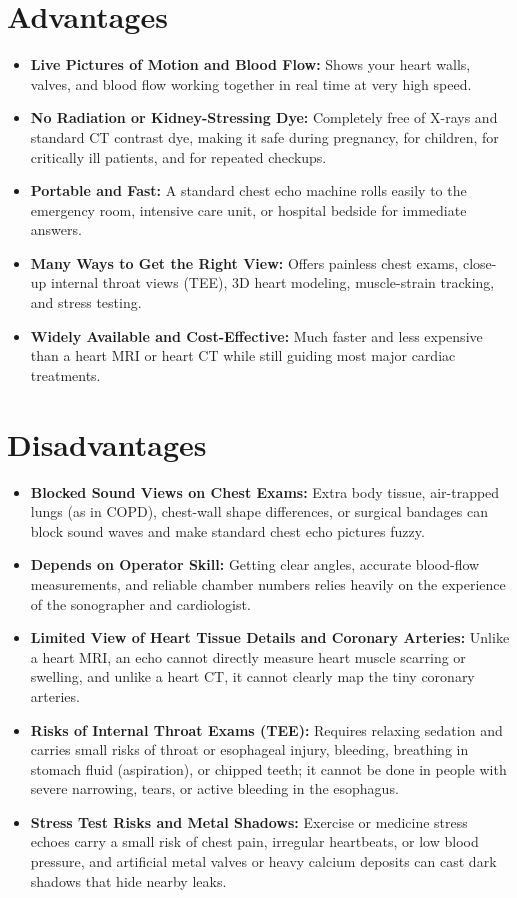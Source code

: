 \section{Advantages}
\begin{itemize}
\item \textbf{Live Pictures of Motion and Blood Flow:} Shows your heart walls, valves, and blood flow working together in real time at very high speed.
\item \textbf{No Radiation or Kidney-Stressing Dye:} Completely free of X-rays and standard CT contrast dye, making it safe during pregnancy, for children, for critically ill patients, and for repeated checkups.
\item \textbf{Portable and Fast:} A standard chest echo machine rolls easily to the emergency room, intensive care unit, or hospital bedside for immediate answers.
\item \textbf{Many Ways to Get the Right View:} Offers painless chest exams, close-up internal throat views (TEE), 3D heart modeling, muscle-strain tracking, and stress testing.
\item \textbf{Widely Available and Cost-Effective:} Much faster and less expensive than a heart MRI or heart CT while still guiding most major cardiac treatments.
\end{itemize}


\section{Disadvantages}
\begin{itemize}
\item \textbf{Blocked Sound Views on Chest Exams:} Extra body tissue, air-trapped lungs (as in COPD), chest-wall shape differences, or surgical bandages can block sound waves and make standard chest echo pictures fuzzy.
\item \textbf{Depends on Operator Skill:} Getting clear angles, accurate blood-flow measurements, and reliable chamber numbers relies heavily on the experience of the sonographer and cardiologist.
\item \textbf{Limited View of Heart Tissue Details and Coronary Arteries:} Unlike a heart MRI, an echo cannot directly measure heart muscle scarring or swelling, and unlike a heart CT, it cannot clearly map the tiny coronary arteries.
\item \textbf{Risks of Internal Throat Exams (TEE):} Requires relaxing sedation and carries small risks of throat or esophageal injury, bleeding, breathing in stomach fluid (aspiration), or chipped teeth; it cannot be done in people with severe narrowing, tears, or active bleeding in the esophagus.
\item \textbf{Stress Test Risks and Metal Shadows:} Exercise or medicine stress echoes carry a small risk of chest pain, irregular heartbeats, or low blood pressure, and artificial metal valves or heavy calcium deposits can cast dark shadows that hide nearby leaks.
\end{itemize}


